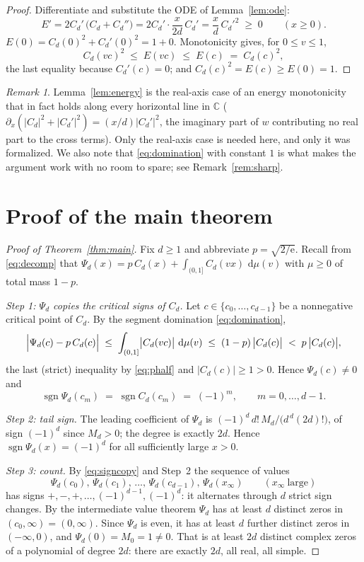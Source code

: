 \documentclass[11pt]{amsart}
\theoremstyle{definition}
\theoremstyle{remark}
\newtheorem{remark}[theorem]{Remark}
\DeclareMathOperator{\sgn}{sgn}
\newcommand{\dd}{\,\mathrm{d}}
\newcommand{\e}{\mathrm{e}}
\newcommand{\C}{\mathbb{C}}
\begin{document}
\begin{proof}
Differentiate and substitute the ODE of Lemma~\ref{lem:ode}:
\[
E'=2C_d'\,\bigl(C_d+C_d''\bigr)=2C_d'\cdot\frac{x}{2d}\,C_d'
=\frac{x}{d}\,C_d'^2\;\ge\;0\qquad(x\ge0).
\]
$E(0)=C_d(0)^2+C_d'(0)^2=1+0$. Monotonicity gives, for $0\le v\le1$,
\[
C_d(vc)^2\;\le\;E(vc)\;\le\;E(c)\;=\;C_d(c)^2 ,
\]
the last equality because $C_d'(c)=0$; and
$C_d(c)^2=E(c)\ge E(0)=1$.
\end{proof}

\begin{remark}
Lemma~\ref{lem:energy} is the real-axis case of an energy monotonicity
that in fact holds along every horizontal line in $\C$
($\partial_x(|C_d|^2+|C_d'|^2)=(x/d)|C_d'|^2$, the imaginary part of
$w$ contributing no real part to the cross terms). Only the real-axis
case is needed here, and only it was formalized. We also note that
\eqref{eq:domination} with constant $1$ is what makes the argument
work with no room to spare; see Remark~\ref{rem:sharp}.
\end{remark}

\section{Proof of the main theorem}\label{sec:proof}

\begin{proof}[Proof of Theorem~\ref{thm:main}]
Fix $d\ge1$ and abbreviate $p=\sqrt{2/\e}$. Recall from
\eqref{eq:decomp} that
$\Psi_d(x)=p\,C_d(x)+\int_{(0,1]}C_d(vx)\,\dd\mu(v)$ with $\mu\ge0$ of
total mass $1-p$.

\emph{Step 1: $\Psi_d$ copies the critical signs of $C_d$.} Let
$c\in\{c_0,\dots,c_{d-1}\}$ be a nonnegative critical point of $C_d$.
By the segment domination \eqref{eq:domination},
\[
\Bigl|\Psi_d(c)-p\,C_d(c)\Bigr|
\;\le\;\int_{(0,1]}\bigl|C_d(vc)\bigr|\,\dd\mu(v)
\;\le\;(1-p)\,\bigl|C_d(c)\bigr|
\;<\;p\,\bigl|C_d(c)\bigr| ,
\]
the last (strict) inequality by \eqref{eq:phalf} and
$|C_d(c)|\ge1>0$. Hence $\Psi_d(c)\ne0$ and
\begin{equation}\label{eq:signcopy}
\sgn\Psi_d(c_m)\;=\;\sgn C_d(c_m)\;=\;(-1)^m,
\qquad m=0,\dots,d-1 .
\end{equation}

\emph{Step 2: tail sign.} The leading coefficient of $\Psi_d$ is
$(-1)^d\,d!\,M_d/\bigl(d^{\,d}(2d)!\bigr)$, of sign $(-1)^d$ since
$M_d>0$; the degree is exactly $2d$. Hence
$\sgn\Psi_d(x)=(-1)^d$ for all sufficiently large $x>0$.

\emph{Step 3: count.} By \eqref{eq:signcopy} and Step~2 the sequence
of values
\[
\Psi_d(c_0),\,\Psi_d(c_1),\,\dots,\,\Psi_d(c_{d-1}),\,
\Psi_d(x_\infty)\qquad(x_\infty\ \text{large})
\]
has signs $+,-,+,\dots,(-1)^{d-1},(-1)^d$: it alternates through $d$
strict sign changes. By the intermediate value theorem $\Psi_d$ has at
least $d$ distinct zeros in $(c_0,\infty)=(0,\infty)$. Since $\Psi_d$
is even, it has at least $d$ further distinct zeros in $(-\infty,0)$,
and $\Psi_d(0)=M_0=1\neq0$. That is at least $2d$ distinct complex
zeros of a polynomial of degree $2d$: there are exactly $2d$, all
real, all simple.
\end{proof}
\end{document}
